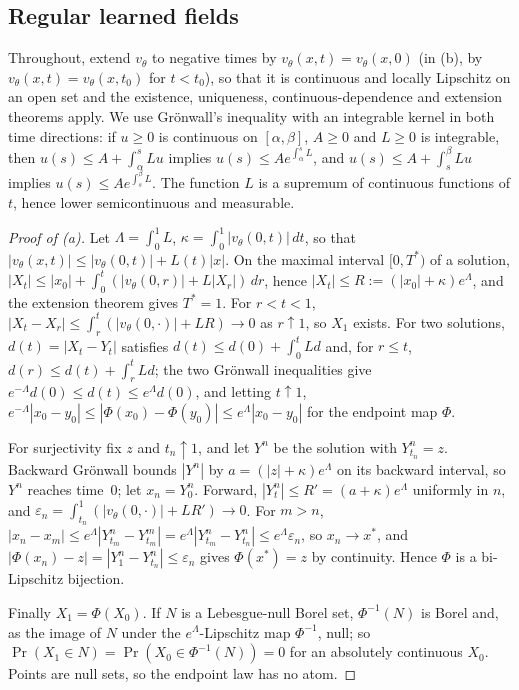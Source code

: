 \documentclass{article} %
\makeatletter
\newif\ificlr
\newcommand{\placeblock}[1]{\ificlr\@nameuse{moved@#1}\fi}
\theoremstyle{plain}
\theoremstyle{definition}
\theoremstyle{remark}
\makeatother
\begin{document}
\subsection{Regular learned fields}
\label{apx:pf-regular}

\ificlr\placeblock{regular}\else\propregular*\fi
Throughout, extend $v_\theta$ to negative times by $v_\theta(x,t)=v_\theta(x,0)$ (in (b), by
$v_\theta(x,t)=v_\theta(x,t_0)$ for $t<t_0$), so that it is continuous and locally Lipschitz on an
open set and the existence, uniqueness, continuous-dependence and extension theorems apply. We
use Gr\"onwall's inequality with an integrable kernel in both time directions: if $u\ge0$ is
continuous on $[\alpha,\beta]$, $A\ge0$ and $L\ge0$ is integrable, then
$u(s)\le A+\int_\alpha^sLu$ implies $u(s)\le Ae^{\int_\alpha^sL}$, and $u(s)\le A+\int_s^\beta Lu$
implies $u(s)\le Ae^{\int_s^\beta L}$. The function $L$ is a supremum of continuous functions of
$t$, hence lower semicontinuous and measurable.

\begin{proof}[Proof of (a)]
Let $\Lambda=\int_0^1L$, $\kappa=\int_0^1|v_\theta(0,t)|\,dt$, so that
$|v_\theta(x,t)|\le|v_\theta(0,t)|+L(t)|x|$. On the maximal interval $[0,T^*)$ of a solution,
$|X_t|\le|x_0|+\int_0^t(|v_\theta(0,r)|+L|X_r|)\,dr$, hence $|X_t|\le R:=(|x_0|+\kappa)e^\Lambda$,
and the extension theorem gives $T^*=1$. For $r<t<1$,
$|X_t-X_r|\le\int_r^t(|v_\theta(0,\cdot)|+LR)\to0$ as $r\uparrow1$, so $X_1$ exists. For two
solutions, $d(t)=|X_t-Y_t|$ satisfies $d(t)\le d(0)+\int_0^tLd$ and, for $r\le t$,
$d(r)\le d(t)+\int_r^tLd$; the two Gr\"onwall inequalities give
$e^{-\Lambda}d(0)\le d(t)\le e^\Lambda d(0)$, and letting $t\uparrow1$,
$e^{-\Lambda}|x_0-y_0|\le|\Phi(x_0)-\Phi(y_0)|\le e^\Lambda|x_0-y_0|$ for the endpoint map
$\Phi$.

For surjectivity fix $z$ and $t_n\uparrow1$, and let $Y^n$ be the solution with $Y^n_{t_n}=z$.
Backward Gr\"onwall bounds $|Y^n|$ by $a=(|z|+\kappa)e^\Lambda$ on its backward interval, so
$Y^n$ reaches time~$0$; let $x_n=Y^n_0$. Forward, $|Y^n_t|\le R'=(a+\kappa)e^\Lambda$ uniformly in
$n$, and $\varepsilon_n=\int_{t_n}^1(|v_\theta(0,\cdot)|+LR')\to0$. For $m>n$,
$|x_n-x_m|\le e^\Lambda|Y^n_{t_m}-Y^m_{t_m}|=e^\Lambda|Y^n_{t_m}-Y^n_{t_n}|\le e^\Lambda\varepsilon_n$,
so $x_n\to x^\ast$, and $|\Phi(x_n)-z|=|Y^n_1-Y^n_{t_n}|\le\varepsilon_n$ gives $\Phi(x^\ast)=z$ by
continuity. Hence $\Phi$ is a bi-Lipschitz bijection.

Finally $X_1=\Phi(X_0)$. If $N$ is a Lebesgue-null Borel set, $\Phi^{-1}(N)$ is Borel and, as the
image of $N$ under the $e^\Lambda$-Lipschitz map $\Phi^{-1}$, null; so
$\Pr(X_1\in N)=\Pr(X_0\in\Phi^{-1}(N))=0$ for an absolutely continuous $X_0$. Points are null
sets, so the endpoint law has no atom.
\end{proof}
\end{document}
